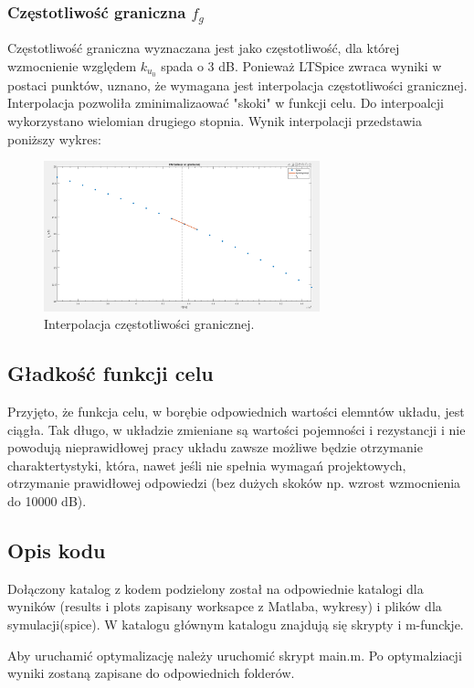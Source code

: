 \documentclass{article}
\begin{document}
\subsubsection*{Częstotliwość graniczna $f_g$}
Częstotliwość graniczna wyznaczana jest jako częstotliwość, dla której wzmocnienie względem $k_{u{_0}}$ spada o 3 dB.
Ponieważ LTSpice zwraca wyniki w postaci punktów, uznano, że wymagana jest interpolacja częstotliwości granicznej. Interpolacja pozwoliła zminimalizaować "skoki" w funkcji celu. Do interpoalcji wykorzystano wielomian drugiego stopnia. Wynik interpolacji przedstawia poniższy wykres:
\begin{figure}[h]
	\includegraphics[width=8cm]{graphics/fg_interp.png}
	\centering
	\caption{Interpolacja częstotliwości granicznej.}
\end{figure}




\subsection{Gładkość funkcji celu}
Przyjęto, że funkcja celu, w borębie odpowiednich wartości elemntów układu, jest ciągła. Tak długo, w układzie zmieniane są wartości pojemności i rezystancji i
nie powodują nieprawidłowej pracy układu zawsze możliwe będzie otrzymanie charaktertystyki, która, nawet jeśli nie spełnia wymagań projektowych, otrzymanie prawidłowej odpowiedzi (bez dużych skoków
np. wzrost wzmocnienia do 10000 dB).
\subsection{Opis kodu}
Dołączony katalog z kodem podzielony został na odpowiednie katalogi dla wyników (results i plots zapisany worksapce z Matlaba, wykresy) i plików dla symulacji(spice).
W katalogu głównym katalogu znajdują się skrypty i m-funckje. 

Aby uruchamić optymalizację należy uruchomić skrypt main.m. Po optymalziacji wyniki zostaną zapisane do odpowiednich folderów.
\end{document}
